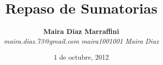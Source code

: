 \title{\textbf{Repaso de Sumatorias \Sigma}}
\author{\textbf{Maira Diaz Marraffini} 
\\
\emph{maira.diaz.73@gmail.com} 
\emph{\faGithub maira1001001} 
\emph{\faLinkedinSquare Maira Diaz} }
\date{1 de octubre, 2012}
